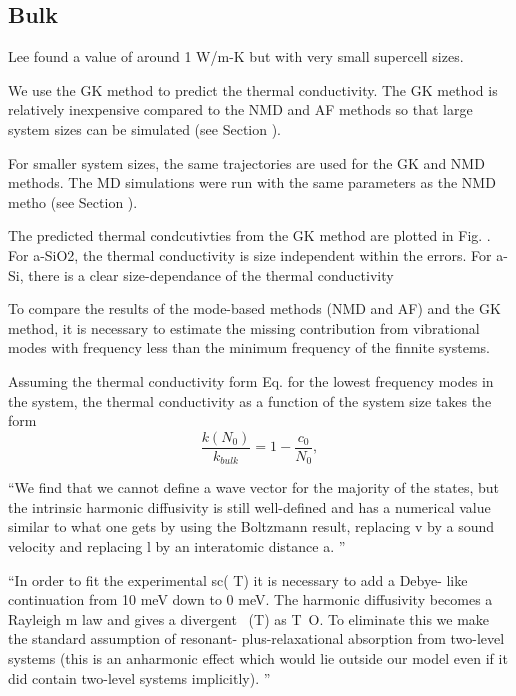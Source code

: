 \documentclass[aps,prb,twocolumn,superscriptaddress,footinbib,amsmath,amssymb,floatfix]{revtex4}
\begin{document}
\subsection{\label{S:Bulk}Bulk}

Lee found a value of around 1 W/m-K 
but with very small supercell sizes.\cite{lee_molecular-dynamics_1991}

We use the GK method to predict the thermal conductivity. The GK method 
is relatively inexpensive compared to the NMD and AF methods so that 
large system sizes 
can be simulated (see Section ).  

For smaller system sizes, the same trajectories are used for the GK and 
NMD methods. The MD simulations were run with the same parameters 
as the NMD metho (see Section ). 

The predicted thermal condcutivties from the GK method are plotted 
in Fig. . For a-SiO2, the thermal conductivity is size independent 
within the errors.  For a-Si, there is a clear size-dependance of the 
thermal conductivity

To compare the results of the mode-based methods (NMD and AF) and 
the GK method, it is necessary to estimate the missing contribution from 
vibrational modes with frequency less than the minimum frequency of 
the finnite systems. 

Assuming the thermal conductivity form Eq.  for the lowest frequency modes in 
the system, the thermal conductivity as a function of the system size 
takes the form
\begin{equation}\label{EQ:k0}
\frac{k(N_0)}{k_{bulk}} = 1 - \frac{c_0}{N_0},
\end{equation}

``We find that we cannot define a wave vector for the
majority of the states, but the intrinsic harmonic diffusivity is still well-defined and has a numerical value
similar to what one gets by using the Boltzmann result, replacing v by a sound velocity and replacing l by
an interatomic distance a.
''\cite{feldman_thermal_1993}

``In order to fit the experimental sc( T) it is necessary to add a Debye-
like continuation from 10 meV down to 0 meV. The harmonic diffusivity becomes a Rayleigh m
law
and gives a divergent ~(T) as T~O. To eliminate this we make the standard assumption of resonant-
plus-relaxational absorption from two-level systems (this is an anharmonic effect which would lie outside
our model even if it did contain two-level systems implicitly).
''\cite{feldman_thermal_1993}
\end{document}
